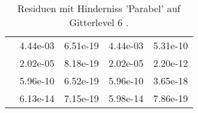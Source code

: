 \begin{table}
\begin{tabular}{c|cc|cc|}
\multicolumn{1}{|c|}{} & \multicolumn{1}{|c|}{  4.44e-03} & \multicolumn{1}{|c|}{  6.51e-19} & \multicolumn{1}{|c|}{  4.44e-03} & \multicolumn{1}{|c|}{  5.31e-10} \\ 
\multicolumn{1}{|c|}{} & \multicolumn{1}{|c|}{  2.02e-05} & \multicolumn{1}{|c|}{  8.18e-19} & \multicolumn{1}{|c|}{  2.02e-05} & \multicolumn{1}{|c|}{  2.20e-12} \\ 
\multicolumn{1}{|c|}{} & \multicolumn{1}{|c|}{  5.96e-10} & \multicolumn{1}{|c|}{  6.52e-19} & \multicolumn{1}{|c|}{  5.96e-10} & \multicolumn{1}{|c|}{  3.65e-18} \\ 
\multicolumn{1}{|c|}{} & \multicolumn{1}{|c|}{  6.13e-14} & \multicolumn{1}{|c|}{  7.15e-19} & \multicolumn{1}{|c|}{  5.98e-14} & \multicolumn{1}{|c|}{  7.86e-19} \\ 
\hline 
\end{tabular}\caption{Residuen mit Hinderniss 'Parabel' auf Gitterlevel 6 .}\label{tab:Residuum_Parabel_level6}
\end{table} 
